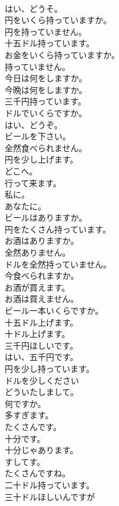 \documentclass[8pt]{extreport}
\begin{document}
\begin{CJK}{UTF8}{min}
\\	はい、どうそ。	
\\	円をいくら持っていますか。	
\\	円を持っていません。	
\\	十五ドル持っています。	
\\	お金をいくら持っていますか。	
\\	持っていません。	
\\	今日は何をしますか。	
\\	今晩は何をしますか。	
\\	三千円持っています。	
\\	ドルでいくらですか。	
\\	はい、どうぞ。	
\\	ビールを下さい。	
\\	全然食べられません。	
\\	円を少し上げます。	
\\	どこへ。	
\\	行って来ます。	
\\	私に。	
\\	あなたに。	
\\	ビールはありますか。	
\\	円をたくさん持っています。	
\\	お酒はありますか。	
\\	全然ありません。	
\\	ドルを全然持っていません。	
\\	今食べられますか。	
\\	お酒が買えます。	
\\	お酒は買えません。	
\\	ビール一本いくらですか。	
\\	十五ドル上げます。	
\\	十ドル上げます。	
\\	三千円ほしいです。	
\\	はい、五千円です。	
\\	円を少し持っています。	
\\	ドルを少しください	
\\	どういたしまして。	
\\	何ですか。	
\\	多すぎます。	
\\	たくさんです。	
\\	十分です。	
\\	十分じゃあります。	
\\	すしてす。	
\\	たくさんですね。	
\\	二十ドル持っています。	
\\	三十ドルほしいんですが	
\end{CJK}
\end{document}
